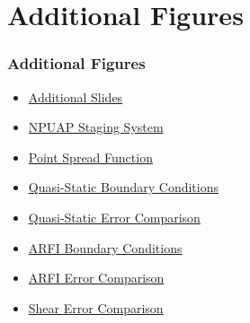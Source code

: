 \documentclass{beamer}
\begin{document}
	\section{Additional Figures}
		\begin{frame}[label=additionalFigures]
			\frametitle{Additional Figures}
			\begin{itemize}
				\item \hyperlink{additionalSlides}{Additional Slides}
				\item \hyperlink{npuapStaging}{NPUAP Staging System}
				\item \hyperlink{psf}{Point Spread Function}
				\item \hyperlink{quasiBC}{Quasi-Static Boundary Conditions}
				\item \hyperlink{quasiError}{Quasi-Static Error Comparison}
				\item \hyperlink{arfiBC}{ARFI Boundary Conditions}
				\item \hyperlink{arfiError}{ARFI Error Comparison}
				\item \hyperlink{shearError}{Shear Error Comparison}
			\end{itemize}
		\end{frame}
\end{document}
